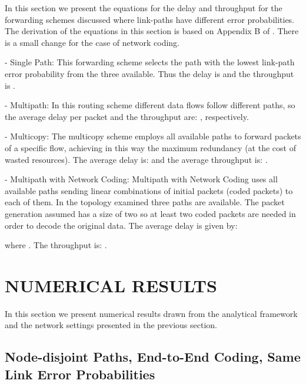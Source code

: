 \documentclass[journal, onecolumn, 12pt]{IEEEtran}
\begin{document}
In this section we present the equations for the delay and throughput for the forwarding schemes discussed where link-paths have different error probabilities.
The derivation of the equations in this section is based on Appendix B of \cite{b:pathdivgain1}. There is a small change for the case of network coding.

- Single Path: This forwarding scheme selects the path with the lowest link-path error probability from the three available.
Thus the delay is  and the throughput is .

- Multipath: In this routing scheme different data flows follow different paths, so the average delay per packet and the throughput are:
,  respectively.

- Multicopy: The multicopy scheme employs all available paths to forward packets of a specific flow, achieving in this way the maximum redundancy (at the cost of wasted resources).
The average delay is:  and the average throughput is: .

- Multipath with Network Coding: Multipath with Network Coding uses all available paths sending linear combinations of initial packets (coded packets) to each of them.
In the topology examined three paths are available.
The packet generation assumed has a size of two so at least two coded packets are needed in order to decode the original data.
The average delay is given by:

where .
The throughput is: .

\section{\uppercase{Numerical Results}}
\label{sec:numerical_results}

In this section we present numerical results drawn from the analytical framework and the network settings presented in the previous section.

\subsection{Node-disjoint Paths, End-to-End Coding, Same Link Error Probabilities}
\label{sec:numerical_node_disj}
\end{document}
